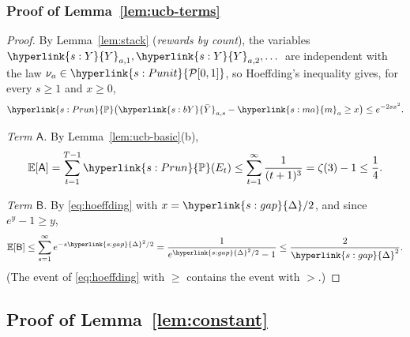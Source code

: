 \documentclass[11pt]{article}
\newcommand{\E}{\mathbb{E}}
\newcommand{\Prob}{\mathbb{P}}
\newcommand{\sy}[2]{{\hyperlink{#1}{#2}}}
\newcommand{\Punit}{\sy{s:Punit}{\mathcal{P}[0,1]}}
\newcommand{\marm}{\sy{s:ma}{m}}
\newcommand{\gap}{\sy{s:gap}{\Delta}}
\newcommand{\Pru}{\sy{s:Prun}{\Prob}}
\newcommand{\Yc}{\sy{s:Y}{Y}}
\newcommand{\bY}{\sy{s:bY}{\bar{Y}}}
\begin{document}
\subsubsection{Proof of Lemma~\ref{lem:ucb-terms}}\label{sec:proof-ucb-terms}

\begin{proof}
By Lemma~\ref{lem:stack} (\emph{rewards by count}), the variables $\Yc_{a,1},\Yc_{a,2},\dots$ are
independent with the law $\nu_a\in\Punit$, so Hoeffding's inequality gives, for every $s\ge1$ and
$x\ge0$,
\begin{equation}\label{eq:hoeffding}
  \Pru\big(\bY_{a,s}-\marm_a\ge x\big)\le e^{-2sx^2}.
\end{equation}

\emph{Term $\mathsf A$.} By Lemma~\ref{lem:ucb-basic}(b),
\begin{equation*}
  \E[\mathsf A]=\sum_{t=1}^{T-1}\Pru(E_t)\le\sum_{t=1}^{\infty}\frac{1}{(t+1)^3}=\zeta(3)-1\le\frac14.
\end{equation*}

\emph{Term $\mathsf B$.} By \eqref{eq:hoeffding} with $x=\gap/2$, and since $e^y-1\ge y$,
\begin{equation*}
  \E[\mathsf B]\le\sum_{s=1}^{\infty}e^{-s\gap^2/2}=\frac{1}{e^{\gap^2/2}-1}\le\frac{2}{\gap^2}.
\end{equation*}
(The event of \eqref{eq:hoeffding} with $\ge$ contains the event with $>$.)
\end{proof}

\subsection{Proof of Lemma~\ref{lem:constant}}\label{sec:proof-constant}
\end{document}
